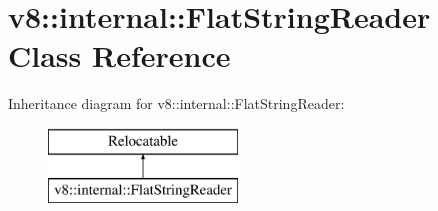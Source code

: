 \hypertarget{classv8_1_1internal_1_1_flat_string_reader}{}\section{v8\+:\+:internal\+:\+:Flat\+String\+Reader Class Reference}
\label{classv8_1_1internal_1_1_flat_string_reader}
Inheritance diagram for v8\+:\+:internal\+:\+:Flat\+String\+Reader\+:\begin{figure}[H]
\begin{center}
\leavevmode
\includegraphics[height=2.000000cm]{classv8_1_1internal_1_1_flat_string_reader}
\end{center}
\end{figure}
